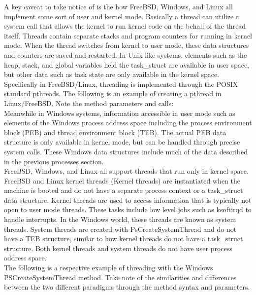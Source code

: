 \documentclass[letterpaper,10pt,titlepage]{article}
\begin{document}
A key caveat to take notice of is the how FreeBSD, Windows, and Linux all implement some sort of user and kernel mode.  Basically a thread can utilize a system call that allows the kernel to run kernel code on the behalf of the thread itself.  Threads contain separate stacks and program counters for running in kernel mode.  When the thread switches from kernel to user mode, these data structures and counters are saved and restarted.  In Unix like systems, elements such as the heap, stack, and global variables held the task\_struct are available in user space, but other data such as task state are only available in the kernel space.\cite{lkd4}  Specifically in FreeBSD/Linux, threading is implemented through the POSIX standard pthreads.  The following is an example of creating a pthread in Linux/FreeBSD.\cite{pthread1}  Note the method parameters and calls:\\



Meanwhile in Windows systems, information accessible in user mode such as elements of the Windows process address space including the process environment block (PEB) and thread environment block (TEB).  The actual PEB data structure is only available in kernel mode, but can be handled through precise system calls.  These Windows data structures include much of the data described in the previous processes section.\\

FreeBSD, Windows, and Linux all support threads that run only in kernel space.  FreeBSD and Linux kernel threads (Kernel threads) are instantiated when the machine is booted and do not have a separate process context or a task\_struct data structure.  Kernel threads are used to access information that is typically not open to user mode threads.  These tasks include low level jobs such as ksoftirqd to handle interrupts.  In the Windows world, these threads are known as system threads.  System threads are created with PsCreateSystemThread and do not have a TEB structure, similar to how kernel threads do not have a task\_struct structure.\cite{lkd4}  Both kernel threads and system threads do not have user process address space.\\

The following is a respective example of threading with the Windows PSCreateSystemThread method. \cite{PsCreateSystemThread} Take note of the similarities and differences between the two different paradigms through the method syntax and parameters.
\end{document}
